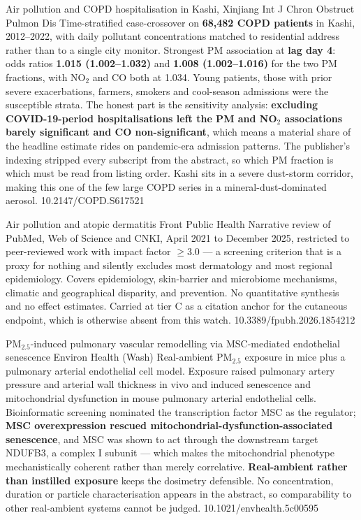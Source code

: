 \documentclass[10pt]{article}
\begin{document}
{Air pollution and COPD hospitalisation in Kashi, Xinjiang}
{Int J Chron Obstruct Pulmon Dis}
{Time-stratified case-crossover on \textbf{68,482 COPD patients} in Kashi, 2012--2022,
with daily pollutant concentrations matched to residential address rather than to a
single city monitor. Strongest PM association at \textbf{lag day 4}: odds ratios
\textbf{1.015 (1.002--1.032)} and \textbf{1.008 (1.002--1.016)} for the two PM fractions,
with NO$_2$ and CO both at 1.034. Young patients, those with prior severe exacerbations,
farmers, smokers and cool-season admissions were the susceptible strata. The honest part
is the sensitivity analysis: \textbf{excluding COVID-19-period hospitalisations left the
PM and NO$_2$ associations barely significant and CO non-significant}, which means a
material share of the headline estimate rides on pandemic-era admission patterns.
The publisher's indexing stripped every subscript from the abstract, so which PM fraction
is which must be read from listing order. Kashi sits in a severe dust-storm corridor,
making this one of the few large COPD series in a mineral-dust-dominated aerosol.}
{10.2147/COPD.S617521}

{Air pollution and atopic dermatitis}
{Front Public Health}
{Narrative review of PubMed, Web of Science and CNKI, April 2021 to December 2025,
restricted to peer-reviewed work with impact factor $\ge$3.0 --- a screening criterion
that is a proxy for nothing and silently excludes most dermatology and most regional
epidemiology. Covers epidemiology, skin-barrier and microbiome mechanisms, climatic and
geographical disparity, and prevention. No quantitative synthesis and no effect
estimates. Carried at tier C as a citation anchor for the cutaneous endpoint, which is
otherwise absent from this watch.}
{10.3389/fpubh.2026.1854212}


{PM$_{2.5}$-induced pulmonary vascular remodelling via MSC-mediated endothelial senescence}
{Environ Health (Wash)}
{Real-ambient PM$_{2.5}$ exposure in mice plus a pulmonary arterial endothelial cell
model. Exposure raised pulmonary artery pressure and arterial wall thickness in vivo and
induced senescence and mitochondrial dysfunction in mouse pulmonary arterial endothelial
cells. Bioinformatic screening nominated the transcription factor MSC as the regulator;
\textbf{MSC overexpression rescued mitochondrial-dysfunction-associated senescence}, and
MSC was shown to act through the downstream target NDUFB3, a complex I subunit ---
which makes the mitochondrial phenotype mechanistically coherent rather than merely
correlative. \textbf{Real-ambient rather than instilled exposure} keeps the dosimetry
defensible. No concentration, duration or particle characterisation appears in the
abstract, so comparability to other real-ambient systems cannot be judged.}
{10.1021/envhealth.5c00595}
\end{document}
